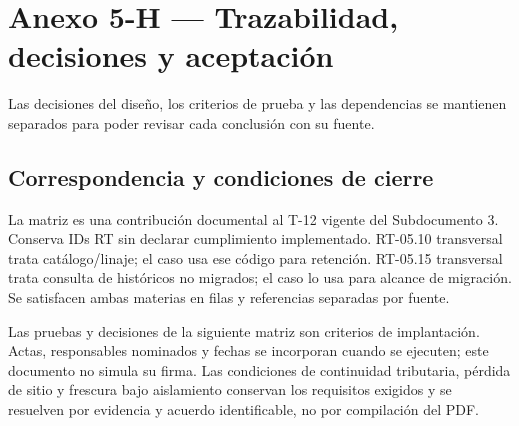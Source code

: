 \chapter*{Anexo 5-H --- Trazabilidad, decisiones y aceptación}
\label{anx:5-H}
Las decisiones del diseño, los criterios de prueba y las dependencias se mantienen separados para poder revisar cada conclusión con su fuente.

\section*{Correspondencia y condiciones de cierre}
La matriz es una contribución documental al T-12 vigente del Subdocumento 3. Conserva IDs RT sin declarar cumplimiento implementado. RT-05.10 transversal trata catálogo/linaje; el caso usa ese código para retención. RT-05.15 transversal trata consulta de históricos no migrados; el caso lo usa para alcance de migración. Se satisfacen ambas materias en filas y referencias separadas por fuente.

Las pruebas y decisiones de la siguiente matriz son criterios de implantación. Actas, responsables nominados y fechas se incorporan cuando se ejecuten; este documento no simula su firma. Las condiciones de continuidad tributaria, pérdida de sitio y frescura bajo aislamiento conservan los requisitos exigidos y se resuelven por evidencia y acuerdo identificable, no por compilación del PDF.

